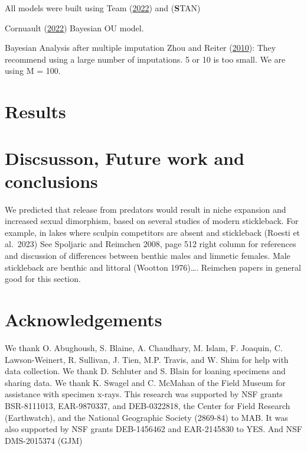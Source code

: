 \documentclass[
  12pt,
]{article}
\begin{document}
All models were built using Team
(\protect\hyperlink{ref-R2022language}{2022}) and (\textbf STAN)

Cornuault (\protect\hyperlink{ref-Cornault2022}{2022}) Bayesian OU
model.

Bayesian Analysis after multiple imputation Zhou and Reiter
(\protect\hyperlink{ref-ZhouReiter2009}{2010}): They recommend using a
large number of imputations. 5 or 10 is too small. We are using M = 100.

\hypertarget{sec:results}{%
\section{Results}\label{sec:results}}

\hypertarget{sec:conclusions}{%
\section{Discsusson, Future work and
conclusions}\label{sec:conclusions}}

We predicted that release from predators would result in niche expansion
and increased sexual dimorphism, based on several studies of modern
stickleback. For example, in lakes where sculpin competitors are absent
and stickleback (Roesti et al.~2023) See Spoljaric and Reimchen 2008,
page 512 right column for references and discussion of differences
between benthic males and limnetic females. Male stickleback are benthic
and littoral (Wootton 1976)\ldots. Reimchen papers in general good for
this section.

\hypertarget{acknowledgements}{%
\section*{Acknowledgements}\label{acknowledgements}}

We thank O. Abughoush, S. Blaine, A. Chaudhary, M. Islam, F. Joaquin, C.
Lawson-Weinert, R. Sullivan, J. Tien, M.P. Travis, and W. Shim for help
with data collection. We thank D. Schluter and S. Blain for loaning
specimens and sharing data. We thank K. Swagel and C. McMahan of the
Field Museum for assistance with specimen x-rays. This research was
supported by NSF grants BSR-8111013, EAR-9870337, and DEB-0322818, the
Center for Field Research (Earthwatch), and the National Geographic
Society (2869-84) to MAB. It was also supported by NSF grants
DEB-1456462 and EAR-2145830 to YES. And NSF DMS-2015374 (GJM)
\end{document}
